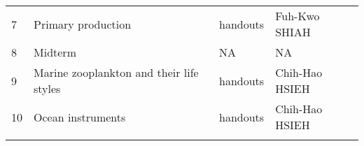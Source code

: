 \documentclass[
]{article}
\begin{document}
\begin{longtable}[]{@{}llll@{}}
\begin{minipage}[t]{0.13\columnwidth}
7\strut
\end{minipage} & \begin{minipage}[t]{0.23\columnwidth}\raggedright
Primary production\strut
\end{minipage} & \begin{minipage}[t]{0.23\columnwidth}\raggedright
handouts\strut
\end{minipage} & \begin{minipage}[t]{0.30\columnwidth}\raggedright
Fuh-Kwo SHIAH\strut
\end{minipage}\tabularnewline
\begin{minipage}[t]{0.13\columnwidth}\raggedright
8\strut
\end{minipage} & \begin{minipage}[t]{0.23\columnwidth}\raggedright
Midterm\strut
\end{minipage} & \begin{minipage}[t]{0.23\columnwidth}\raggedright
NA\strut
\end{minipage} & \begin{minipage}[t]{0.30\columnwidth}\raggedright
NA\strut
\end{minipage}\tabularnewline
\begin{minipage}[t]{0.13\columnwidth}\raggedright
9\strut
\end{minipage} & \begin{minipage}[t]{0.23\columnwidth}\raggedright
Marine zooplankton and their life styles\strut
\end{minipage} & \begin{minipage}[t]{0.23\columnwidth}\raggedright
handouts\strut
\end{minipage} & \begin{minipage}[t]{0.30\columnwidth}\raggedright
Chih-Hao HSIEH\strut
\end{minipage}\tabularnewline
\begin{minipage}[t]{0.13\columnwidth}\raggedright
10\strut
\end{minipage} & \begin{minipage}[t]{0.23\columnwidth}\raggedright
Ocean instruments\strut
\end{minipage} & \begin{minipage}[t]{0.23\columnwidth}\raggedright
handouts\strut
\end{minipage} & \begin{minipage}[t]{0.30\columnwidth}\raggedright
Chih-Hao HSIEH\strut
\end{minipage}\tabularnewline
\begin{minipage}[t]{0.13\columnwidth}\raggedright

\end{minipage}
\end{longtable}
\end{document}
